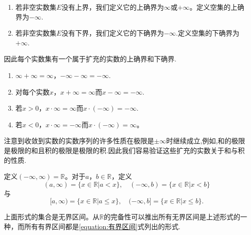 \documentclass[lang=cn,newtx,10pt,scheme=chinese]{../Template/elegantbook}
\begin{document}
\begin{definition}[扩充的实数的上下确界]\label{definition:扩充的实数的上下确界}
\begin{enumerate}
  \item 若非空实数集\(E\)没有上界，我们定义它的上确界为\(\infty\)或$+\infty$。定义空集的上确界为\(-\infty\).
  \item 若非空实数集\(E\)没有下界，我们定义它的下确界为$-\infty$.定义空集的下确界为\(+\infty\).
\end{enumerate}
\end{definition}
\begin{note}
  因此每个实数集有一个属于扩充的实数的上确界和下确界.
\end{note}

\begin{proposition}[扩充的实数关于和与积的性质]\label{proposition:扩充的实数关于和与积的性质}
\begin{enumerate}
  \item \(\infty+\infty=\infty\)，\(-\infty - \infty=-\infty\).
  \item 对每个实数\(x\)，\(x+\infty=\infty\)而\(x - \infty=-\infty\).
  \item 若\(x>0\)，\(x\cdot\infty=\infty\)而\(x\cdot(-\infty)=-\infty\).
  \item 若\(x<0\)，\(x\cdot\infty=-\infty\)而\(x\cdot(-\infty)=\infty\)。
\end{enumerate}
\end{proposition}
\begin{remark}
  注意到收敛到实数的实数序列的许多性质在极限是\(\pm\infty\)时继续成立,例如,和的极限是极限的和且积的极限是极限的积.因此我们容易验证这些扩充的实数关于和与积的性质.
\end{remark}

\begin{definition}[无界区间]\label{definition:无界区间}
  定义\((-\infty,\infty)=\mathbb{R}\)。对于\(a\)，\(b\in\mathbb{R}\)，定义
\[
(a,\infty)=\{x\in\mathbb{R}|a < x\},\quad (-\infty,b)=\{x\in\mathbb{R}|x < b\}
\]
与
\[
[a,\infty)=\{x\in\mathbb{R}|a\leqslant x\},\quad (-\infty,b]=\{x\in\mathbb{R}|x\leqslant b\}.
\]
\end{definition}
\begin{note}
  上面形式的集合是无界区间。从\(\mathbb{R}\)的完备性可以推出所有无界区间是上述形式的一种，而所有有界区间都是\eqref{equation:有界区间}式列出的形式.
\end{note}
\end{document}
